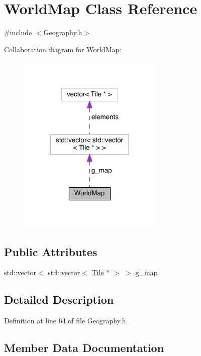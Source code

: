 \hypertarget{class_world_map}{}\section{World\+Map Class Reference}
\label{class_world_map}


{\ttfamily \#include $<$Geography.\+h$>$}



Collaboration diagram for World\+Map\+:\nopagebreak
\begin{figure}[H]
\begin{center}
\leavevmode
\includegraphics[width=196pt]{class_world_map__coll__graph}
\end{center}
\end{figure}
\subsection*{Public Attributes}
\begin{DoxyCompactItemize}
\item 
std\+::vector$<$ std\+::vector$<$ \hyperlink{class_tile}{Tile} $\ast$ $>$ $>$ \hyperlink{class_world_map_af3793bf3fcd5d16b5077fb07586f1dbb}{g\+\_\+map}
\end{DoxyCompactItemize}


\subsection{Detailed Description}


Definition at line 64 of file Geography.\+h.



\subsection{Member Data Documentation}
\hypertarget{class_world_map_af3793bf3fcd5d16b5077fb07586f1dbb}{}
